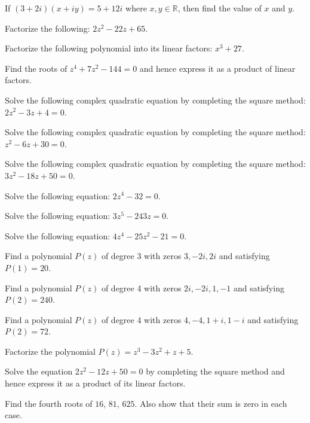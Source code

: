\documentclass[11pt,a4paper]{article}
\begin{document}
\begin{longlist}
\item If $(3+2i)(x+iy)=5+12i$ where $x,y\in\mathbb{R}$, then find the value of $x$ and $y$.

\item Factorize the following: $2z^2-22z+65$.

\item Factorize the following polynomial into its linear factors: $x^3+27$.

\item Find the roots of $z^4+7z^2-144=0$ and hence express it as a product of linear factors.

\item Solve the following complex quadratic equation by completing the square method: $2z^2-3z+4=0$.

\item Solve the following complex quadratic equation by completing the square method: $z^2-6z+30=0$.

\item Solve the following complex quadratic equation by completing the square method: $3z^2-18z+50=0$.

\item Solve the following equation: $2z^4-32=0$.

\item Solve the following equation: $3z^5-243z=0$.

\item Solve the following equation: $4z^4-25z^2-21=0$.

\item Find a polynomial $P(z)$ of degree 3 with zeros $3,-2i,2i$ and satisfying $P(1)=20$.

\item Find a polynomial $P(z)$ of degree 4 with zeros $2i,-2i,1,-1$ and satisfying $P(2)=240$.

\item Find a polynomial $P(z)$ of degree 4 with zeros $4,-4,1+i,1-i$ and satisfying $P(2)=72$.

\item Factorize the polynomial $P(z)=z^3-3z^2+z+5$.

\item Solve the equation $2z^2-12z+50=0$ by completing the square method and hence express it as a product of its linear factors.

\item Find the fourth roots of $16$, $81$, $625$. Also show that their sum is zero in each case.


\end{longlist}
\end{document}
